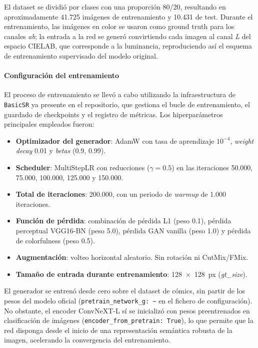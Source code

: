 \documentclass[a4paper]{article}
\begin{document}
El dataset se dividió por clases con una proporción 80/20, resultando en aproximadamente 41.725 imágenes de entrenamiento y 10.431 de test. Durante el entrenamiento, las imágenes en color se usaron como ground truth para los canales \textit{ab}; la entrada a la red se generó convirtiendo cada imagen al canal \textit{L} del espacio CIELAB, que corresponde a la luminancia, reproduciendo así el esquema de entrenamiento supervisado del modelo original.

\paragraph{Configuración del entrenamiento}
 
El proceso de entrenamiento se llevó a cabo utilizando la infraestructura de \texttt{BasicSR} ya presente en el repositorio, que gestiona el bucle de entrenamiento, el guardado de checkpoints y el registro de métricas. Los hiperparámetros principales empleados fueron:
 
\begin{itemize}
  \item \textbf{Optimizador del generador}: AdamW con tasa de aprendizaje $10^{-4}$, \textit{weight decay} 0.01 y \textit{betas} (0.9, 0.99).
  \item \textbf{Scheduler}: MultiStepLR con reducciones ($\gamma = 0.5$) en las iteraciones 50.000, 75.000, 100.000, 125.000 y 150.000.
  \item \textbf{Total de iteraciones}: 200.000, con un periodo de \textit{warmup} de 1.000 iteraciones.
  \item \textbf{Función de pérdida}: combinación de pérdida L1 (peso 0.1), pérdida perceptual VGG16-BN (peso 5.0), pérdida GAN vanilla (peso 1.0) y pérdida de colorfulness (peso 0.5).
  \item \textbf{Augmentación}: volteo horizontal aleatorio. Sin rotación ni CutMix/FMix.
  \item \textbf{Tamaño de entrada durante entrenamiento}: 128~×~128~px (\textit{gt\_size}).
\end{itemize}
 
El generador se entrenó desde cero sobre el dataset de cómics, sin partir de los pesos del modelo oficial (\texttt{pretrain\_network\_g: \textasciitilde{}} en el fichero de configuración). No obstante, el encoder ConvNeXT-L sí se inicializó con pesos preentrenados en clasificación de imágenes (\texttt{encoder\_from\_pretrain: True}), lo que permite que la red disponga desde el inicio de una representación semántica robusta de la imagen, acelerando la convergencia del entrenamiento.
\end{document}
